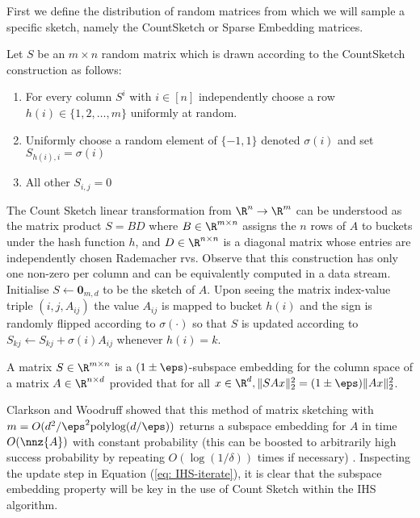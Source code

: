 
First we define the distribution of random matrices from which we will sample a
specific sketch, namely the CountSketch or Sparse Embedding matrices.

Let $S$ be an $m \times n$ random matrix which is drawn according to the CountSketch construction
as follows:

\begin{enumerate}
  \item For every column $S^i$ with $i \in [n]$ independently choose a row $h(i)
  \in \{ 1, 2, \ldots, m \} $ uniformly at random.
  \item Uniformly choose a random element of $\{ -1, 1 \}$ denoted $\sigma(i)$
  and set $S_{h(i), i} = \sigma(i)$
  \item All other $S_{i,j} = 0$
\end{enumerate}
The Count Sketch linear transformation from $\R^n \rightarrow \R^m$ can be
understood as the matrix product $S = BD$ where $B \in \R^{m \times n}$ assigns
the $n$ rows of $A$ to buckets under the hash function $h$, and $D \in \R^{n \times
n}$ is a diagonal matrix whose entries are independently chosen Rademacher rvs.
Observe that this construction has only one non-zero per column and can be
equivalently computed in a data stream.
Initialise $S \leftarrow \textbf{0}_{m,d}$ to be the sketch of $A$.
Upon seeing the matrix index-value triple $(i,j,A_{ij})$ the value $A_{ij}$ is
mapped to bucket $h(i)$ and the sign is randomly flipped according to $\sigma(\cdot)$
so that $S$ is updated according to $S_{kj} \leftarrow S_{kj} + \sigma(i)A_{ij}$
whenever $h(i) = k$.

\begin{mydef} \label{def: subspace-embedding}
  A matrix $S \in \R^{m \times n}$ is a $(1 \pm \eps)$-subspace embedding for
  the column space of a matrix $A \in \R^{n \times d}$ provided that for all
  $x \in \R^d, \| SAx \|_2^2 = (1 \pm \eps) \|Ax \|_2^2$.
\end{mydef}

\noindent Clarkson and Woodruff showed that this method of matrix sketching with
$m = O(d^2 / \eps^2 \text{polylog}(d/\eps))$ returns a subspace embedding for $A$
in time $O(\nnz{A})$ with constant probability
(this can be boosted to arbitrarily high success probability by repeating $O(\log(1/\delta))$
times if necessary) \cite{clarkson2013low}.
Inspecting the update step in Equation (\ref{eq: IHS-iterate}), it is clear that
the subspace embedding property will be key in the use of Count Sketch within the
IHS algorithm.

